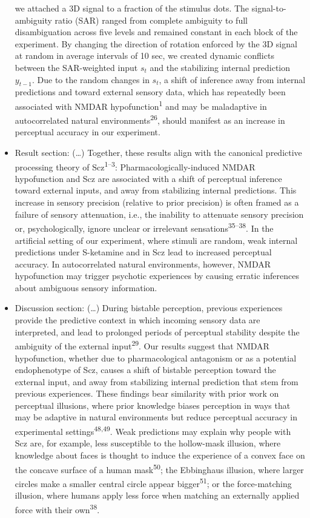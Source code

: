 \documentclass[
]{article}
\begin{document}
\begin{itemize}
  we attached a 3D signal to a fraction of the stimulus dots. The
  signal-to-ambiguity ratio (SAR) ranged from complete ambiguity to full
  disambiguation across five levels and remained constant in each block
  of the experiment. By changing the direction of rotation enforced by
  the 3D signal at random in average intervals of 10 sec, we created
  dynamic conflicts between the SAR-weighted input \(s_t\) and the
  stabilizing internal prediction \(y_{t-1}\). Due to the random changes
  in \(s_t\), a shift of inference away from internal predictions and
  toward external sensory data, which has repeatedly been associated
  with NMDAR hypofunction\textsuperscript{1} and may be maladaptive in
  autocorrelated natural environments\textsuperscript{26}, should
  manifest as an increase in perceptual accuracy in our experiment.
\item
  Result section: (\ldots) Together, these results align with the
  canonical predictive processing theory of Scz\textsuperscript{1--3}:
  Pharmacologically-induced NMDAR hypofunction and Scz are associated
  with a shift of perceptual inference toward external inputs, and away
  from stabilizing internal predictions. This increase in sensory
  precision (relative to prior precision) is often framed as a failure
  of sensory attenuation, i.e., the inability to attenuate sensory
  precision or, psychologically, ignore unclear or irrelevant
  sensations\textsuperscript{35--38}. In the artificial setting of our
  experiment, where stimuli are random, weak internal predictions under
  S-ketamine and in Scz lead to increased perceptual accuracy. In
  autocorrelated natural environments, however, NMDAR hypofunction may
  trigger psychotic experiences by causing erratic inferences about
  ambiguous sensory information.
\item
  Discussion section: (\ldots) During bistable perception, previous
  experiences provide the predictive context in which incoming sensory
  data are interpreted, and lead to prolonged periods of perceptual
  stability despite the ambiguity of the external
  input\textsuperscript{29}. Our results suggest that NMDAR
  hypofunction, whether due to pharmacological antagonism or as a
  potential endophenotype of Scz, causes a shift of bistable perception
  toward the external input, and away from stabilizing internal
  prediction that stem from previous experiences. These findings bear
  similarity with prior work on perceptual illusions, where prior
  knowledge biases perception in ways that may be adaptive in natural
  environments but reduce perceptual accuracy in experimental
  settings\textsuperscript{48,49}. Weak predictions may explain why
  people with Scz are, for example, less susceptible to the hollow-mask
  illusion, where knowledge about faces is thought to induce the
  experience of a convex face on the concave surface of a human
  mask\textsuperscript{50}; the Ebbinghaus illusion, where larger
  circles make a smaller central circle appear
  bigger\textsuperscript{51}; or the force-matching illusion, where
  humans apply less force when matching an externally applied force with
  their own\textsuperscript{38}.
\end{itemize}
\end{document}
